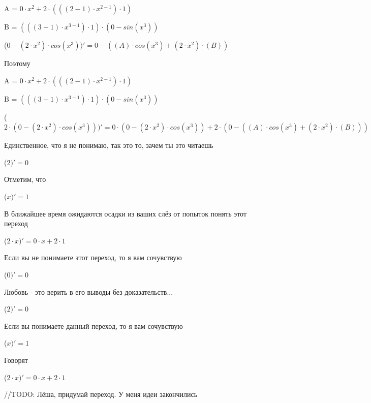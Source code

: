 \documentclass[12pt,a4paper,fleqn]{article}
\begin{document}
\begin{center}
A = $0 \cdot x^{2}+2 \cdot (((2-1) \cdot x^{2-1}) \cdot 1)$\end{center}
\begin{center}
B = $(((3-1) \cdot x^{3-1}) \cdot 1) \cdot (0-sin(x^{3}))$\end{center}
\begin{center}
 ($0-(2 \cdot x^{2}) \cdot cos(x^{3}))'
  = 0-((A) \cdot cos(x^{3})+(2 \cdot x^{2}) \cdot (B))$\end{center}
Поэтому

\begin{center}
A = $0 \cdot x^{2}+2 \cdot (((2-1) \cdot x^{2-1}) \cdot 1)$\end{center}
\begin{center}
B = $(((3-1) \cdot x^{3-1}) \cdot 1) \cdot (0-sin(x^{3}))$\end{center}
\begin{center}
 ($2 \cdot (0-(2 \cdot x^{2}) \cdot cos(x^{3})))'
  = 0 \cdot (0-(2 \cdot x^{2}) \cdot cos(x^{3}))+2 \cdot (0-((A) \cdot cos(x^{3})+(2 \cdot x^{2}) \cdot (B)))$\end{center}
Единственное, что я не понимаю, так это то, зачем ты это читаешь

\begin{center}
 ($2)'
  = 0$\end{center}
Отметим, что

\begin{center}
 ($x)'
  = 1$\end{center}
В ближайшее время ожидаются осадки из ваших слёз от попыток понять этот переход

\begin{center}
 ($2 \cdot x)'
  = 0 \cdot x+2 \cdot 1$\end{center}
Если вы не понимаете этот переход, то я вам сочувствую

\begin{center}
 ($0)'
  = 0$\end{center}
Любовь - это верить в его выводы без доказательств...

\begin{center}
 ($2)'
  = 0$\end{center}
Если вы понимаете данный переход, то я вам сочувствую

\begin{center}
 ($x)'
  = 1$\end{center}
Говорят

\begin{center}
 ($2 \cdot x)'
  = 0 \cdot x+2 \cdot 1$\end{center}
//TODO: Лёша, придумай переход. У меня идеи закончились
\end{document}

